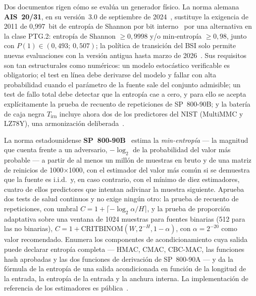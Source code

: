 Dos documentos rigen cómo se evalúa un generador físico. La norma alemana
\textbf{AIS~20/31}, en su versión~3.0 de septiembre de 2024~\cite{peter_2024_ais31},
sustituye la exigencia de 2011 de 0,997~bit de entropía de Shannon por
bit interno~\cite{killmann_2011_ais31} por una alternativa en la clase
PTG.2: entropía de Shannon $\ge0{,}9998$ y/o min-entropía $\ge0{,}98$,
junto con $P(1)\in(0{,}493;\ 0{,}507)$; la política de transición del BSI
solo permite nuevas evaluaciones con la versión antigua hasta marzo de
2026~\cite{bsi_2025_transition}. Sus requisitos son tan estructurales
como numéricos: un modelo estocástico verificable es obligatorio; el test
en línea debe derivarse del modelo y fallar con alta probabilidad cuando
el parámetro de la fuente sale del conjunto admisible; un test de fallo
total debe detectar que la entropía cae a cero, y para ello se acepta
explícitamente la prueba de recuento de repeticiones de SP~800-90B; y la
batería de caja negra $T_{\mathrm{irn}}$ incluye ahora dos de los
predictores del NIST (MultiMMC y LZ78Y), una armonización
deliberada~\cite{peter_2024_ais31, schindler_2024_ecw}.

La norma estadounidense \textbf{SP~800-90B}~\cite{turan_2018_sp80090b}
estima la \emph{min-entropía} --- la magnitud que cuenta frente a un
adversario, $-\log_2$ de la probabilidad del valor más probable --- a
partir de al menos un
millón de muestras en bruto y de una matriz de reinicios de
1000$\times$1000, con el estimador del valor más común si se demuestra
que la fuente es i.i.d.\ y, en caso contrario, con el mínimo de diez
estimadores, cuatro de ellos predictores que intentan adivinar la muestra
siguiente. Aprueba dos tests de salud continuos y no exige ningún otro:
la prueba de recuento de repeticiones, con umbral
$C=1+\lceil-\log_2\alpha/H\rceil$, y la prueba de proporción adaptativa
sobre una ventana de 1024 muestras para fuentes binarias (512 para las no
binarias), $C=1+\mathrm{CRITBINOM}(W,2^{-H},1-\alpha)$, con
$\alpha=2^{-20}$ como valor recomendado. Enumera los componentes de
acondicionamiento cuya salida puede declarar entropía completa --- HMAC,
CMAC, CBC-MAC, las funciones hash aprobadas y las dos funciones de
derivación de SP~800-90A --- y da la fórmula de la entropía de una salida
acondicionada en función de la longitud de la entrada, la entropía de la
entrada y la anchura interna. La implementación de referencia de los
estimadores es pública~\cite{nist_ea_github}.

